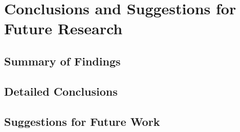 \documentclass[11pt]{book}
\begin{document}
\chapter[Conclusions \& Future Research]{Conclusions and Suggestions for Future Research}\label{conclude}



\section{Summary of Findings}



\section{Detailed Conclusions}



\section{Suggestions for Future Work}







 \markright{ }
\end{document}
